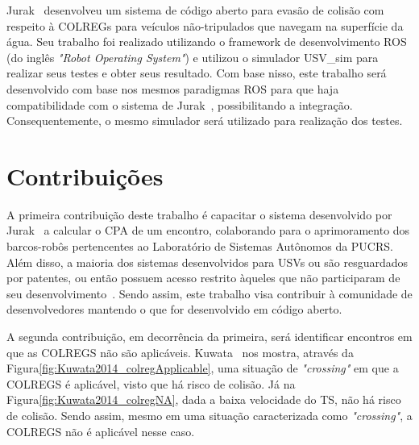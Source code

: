         Jurak~\cite{JURAK2020} desenvolveu um sistema de código aberto para evasão de colisão com respeito à COLREGs para veículos não-tripulados que navegam na superfície da água. Seu trabalho foi realizado utilizando o framework de desenvolvimento ROS (do inglês \textit{"Robot Operating System"}) e utilizou o simulador USV\_sim para realizar seus testes e obter seus resultado. Com base nisso, este trabalho será desenvolvido com base nos mesmos paradigmas ROS para que haja compatibilidade com o sistema de Jurak~\cite{JURAK2020}, possibilitando a integração. Consequentemente, o mesmo simulador será utilizado para realização dos testes.
        
    \section{Contribuições}\label{subchap1:contrib}
        A primeira contribuição deste trabalho é capacitar o sistema desenvolvido por Jurak~\cite{JURAK2020} a calcular o CPA de um encontro, colaborando para o aprimoramento dos barcos-robôs pertencentes ao Laboratório de Sistemas Autônomos da PUCRS. Além disso, a maioria dos sistemas desenvolvidos para USVs ou são resguardados por patentes, ou então possuem acesso restrito àqueles que não participaram de seu desenvolvimento~\cite{JURAK2020}. Sendo assim, este trabalho visa contribuir à comunidade de desenvolvedores mantendo o que for desenvolvido em código aberto.
        
        A segunda contribuição, em decorrência da primeira, será identificar encontros em que as COLREGS não são aplicáveis. Kuwata \etal~nos mostra, através da Figura\ref{fig:Kuwata2014_colregApplicable}, uma situação de \textit{"crossing"} em que a COLREGS é aplicável, visto que há risco de colisão. Já na Figura\ref{fig:Kuwata2014_colregNA}, dada a baixa velocidade do TS, não há risco de colisão. Sendo assim, mesmo em uma situação caracterizada como \textit{"crossing"}, a COLREGS não é aplicável nesse caso.
        
